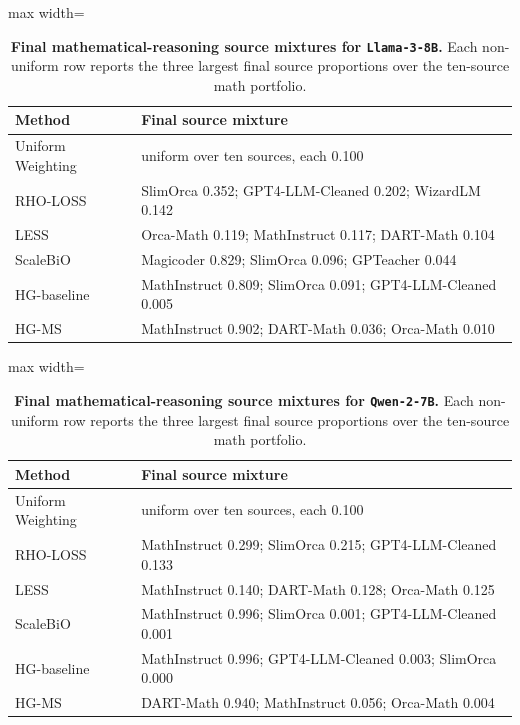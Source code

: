 \documentclass{article}
\theoremstyle{normaltheorem}
\begin{document}
\begin{table}[t]
  \centering
  \caption{\textbf{Final mathematical-reasoning source mixtures for \texttt{Llama-3-8B}.}
  Each non-uniform row reports the three largest final source proportions over the ten-source math portfolio.}
  \label{tab:llm-main-math-mixtures-llama}
  \small
  \begin{adjustbox}{max width=\textwidth}
  \begin{tabular}{ll}
    \toprule
    Method & Final source mixture \\
    \midrule
    Uniform Weighting & uniform over ten sources, each 0.100 \\
    RHO-LOSS & SlimOrca 0.352; GPT4-LLM-Cleaned 0.202; WizardLM 0.142 \\
    LESS & Orca-Math 0.119; MathInstruct 0.117; DART-Math 0.104 \\
    ScaleBiO & Magicoder 0.829; SlimOrca 0.096; GPTeacher 0.044 \\
    HG-baseline & MathInstruct 0.809; SlimOrca 0.091; GPT4-LLM-Cleaned 0.005 \\
    HG-MS & MathInstruct 0.902; DART-Math 0.036; Orca-Math 0.010 \\
    \bottomrule
  \end{tabular}
  \end{adjustbox}
\end{table}

\begin{table}[t]
  \centering
  \caption{\textbf{Final mathematical-reasoning source mixtures for \texttt{Qwen-2-7B}.}
  Each non-uniform row reports the three largest final source proportions over the ten-source math portfolio.}
  \label{tab:llm-main-math-mixtures-qwen}
  \small
  \begin{adjustbox}{max width=\textwidth}
  \begin{tabular}{ll}
    \toprule
    Method & Final source mixture \\
    \midrule
    Uniform Weighting & uniform over ten sources, each 0.100 \\
    RHO-LOSS & MathInstruct 0.299; SlimOrca 0.215; GPT4-LLM-Cleaned 0.133 \\
    LESS & MathInstruct 0.140; DART-Math 0.128; Orca-Math 0.125 \\
    ScaleBiO & MathInstruct 0.996; SlimOrca 0.001; GPT4-LLM-Cleaned 0.001 \\
    HG-baseline & MathInstruct 0.996; GPT4-LLM-Cleaned 0.003; SlimOrca 0.000 \\
    HG-MS & DART-Math 0.940; MathInstruct 0.056; Orca-Math 0.004 \\
    \bottomrule
  \end{tabular}
  \end{adjustbox}
\end{table}
\end{document}
